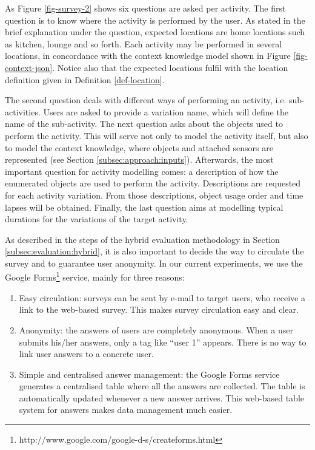 As Figure \ref{fig-survey-2} shows six questions are asked per activity. The first question is to know where the activity is performed by the user. As stated in the brief explanation under the question, expected locations are home locations such as kitchen, lounge and so forth. Each activity may be performed in several locations, in concordance with the context knowledge model shown in Figure \ref{fig-context-json}. Notice also that the expected locations fulfil with the location definition given in Definition \ref{def-location}.

The second question deals with different ways of performing an activity, i.e. sub-activities. Users are asked to provide a variation name, which will define the name of the sub-activity. The next question asks about the objects used to perform the activity. This will serve not only to model the activity itself, but also to model the context knowledge, where objects and attached sensors are represented (see Section \ref{subsec:approach:inputs}). Afterwards, the most important question for activity modelling comes: a description of how the enumerated objects are used to perform the activity. Descriptions are requested for each activity variation. From those descriptions, object usage order and time lapses will be obtained. Finally, the last question aims at modelling typical durations for the variations of the target activity.

As described in the steps of the hybrid evaluation methodology in Section \ref{subsec:evaluation:hybrid}, it is also important to decide the way to circulate the survey and to guarantee user anonymity. In our current experiments, we use the Google Forms\footnote{http://www.google.com/google-d-s/createforms.html} service, mainly for three reasons:

\begin{enumerate}
 \item Easy circulation: surveys can be sent by e-mail to target users, who receive a link to the web-based survey. This makes survey circulation easy and clear.
 \item Anonymity: the answers of users are completely anonymous. When a user submits his/her answers, only a tag like ``user 1'' appears. There is no way to link user answers to a concrete user.
 \item Simple and centralised answer management: the Google Forms service generates a centralised table where all the answers are collected. The table is automatically updated whenever a new answer arrives. This web-based table system for answers makes data management much easier.
\end{enumerate}

